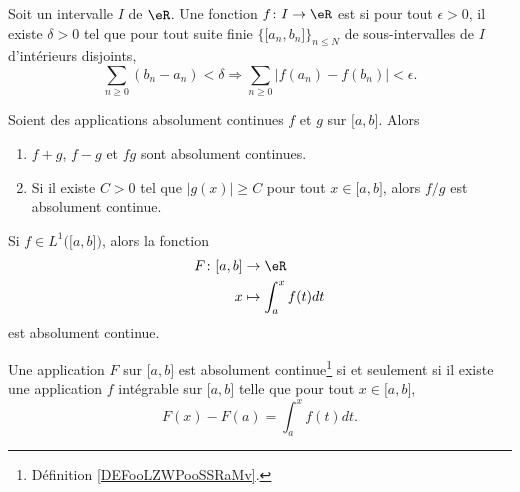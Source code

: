 \begin{definition}	\label{DEFooLZWPooSSRaMv}
	Soit un intervalle \( I\) de \( \eR\). Une fonction \(f \colon I\to \eR  \) est  si pour tout \( \epsilon>0\), il existe \( \delta>0\) tel que pour tout suite finie \( \{ \mathopen[ a_n,b_n\mathclose] \}_{n\leq N}\) de sous-intervalles de \( I\) d'intérieurs disjoints,
	\begin{equation}
		\sum_{n\geq 0}(b_n-a_n)<\delta\Rightarrow \sum_{n\geq 0}| f(a_n)-f(b_n) |<\epsilon.
	\end{equation}
\end{definition}

\begin{proposition}	\label{PROPooNZYKooSlwFYK}
	Soient des applications absolument continues \( f\) et \( g\) sur \( \mathopen[ a,b\mathclose]\). Alors
	\begin{enumerate}
		\item
		      \( f+g\), \( f-g\) et \( fg\) sont absolument continues.
		\item
		      Si il existe \( C>0\) tel que \( | g(x) |\geq C\) pour tout \( x\in\mathopen[ a,b\mathclose]\), alors \( f/g\) est absolument continue.
	\end{enumerate}
\end{proposition}

\begin{proposition}	\label{PROPooHCCWooHaYitq}
	Si \( f\in L^1\big( \mathopen[ a,b\mathclose] \big)\), alors la fonction
	\begin{equation}
		\begin{aligned}
			F\colon \mathopen[ a,b\mathclose] & \to \eR                \\
			x                                 & \mapsto \int_a^xf(t)dt
		\end{aligned}
	\end{equation}
	est absolument continue.
\end{proposition}


\begin{proposition}	\label{PROPooUMXIooUhbZvl}
	Une application \( F\) sur \( \mathopen[ a,b\mathclose]\) est absolument continue\footnote{Définition \ref{DEFooLZWPooSSRaMv}.} si et seulement si il existe une application \( f\) intégrable sur \( \mathopen[ a,b\mathclose]\) telle que pour tout \( x\in\mathopen[ a,b\mathclose]\),
	\begin{equation}
		F(x)-F(a)=\int_a^xf(t)dt.
	\end{equation}
\end{proposition}


